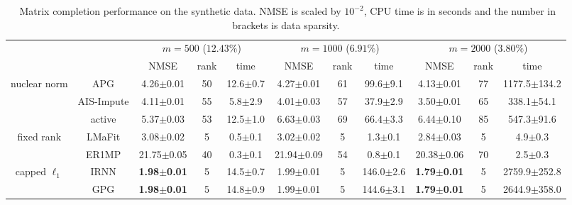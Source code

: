 \documentclass[10pt,journal,compsoc]{IEEEtran}
\begin{document}
\begin{table*}[ht]
	\centering
	\caption{$\!\!$ Matrix completion performance on the synthetic data.
		NMSE is scaled by $10^{-2}$, CPU time is in seconds and the number in brackets is data sparsity.}
	\vspace{-10px}
	\begin{tabular}{cc|ccc|ccc|ccc}
		\hline
		&                     &       \multicolumn{3}{c|}{$m=500$ ($12.43\%$)}       &       \multicolumn{3}{c|}{$m=1000$ ($6.91\%$)}       &       \multicolumn{3}{c}{$m=2000$ ($3.80\%$)}        \\
		&                     &          NMSE          & rank &         time         &          NMSE          & rank &         time         &          NMSE          & rank &         time         \\ \hline
		nuclear norm   &    \textsf{APG}     &     4.26$\pm$0.01      &  50  &     12.6$\pm$0.7     &     4.27$\pm$0.01      &  61  &     99.6$\pm$9.1     &     4.13$\pm$0.01      &  77  &   1177.5$\pm$134.2   \\ \cline{2-11}
		& \textsf{AIS-Impute} &     4.11$\pm$0.01      &  55  &     5.8$\pm$2.9      &     4.01$\pm$0.03      &  57  &     37.9$\pm$2.9     &     3.50$\pm$0.01      &  65  &    338.1$\pm$54.1    \\ \cline{2-11}
		&   \textsf{active}   &     5.37$\pm$0.03      &  53  &     12.5$\pm$1.0     &     6.63$\pm$0.03      &  69  &     66.4$\pm$3.3     &     6.44$\pm$0.10      &  85  &    547.3$\pm$91.6    \\ \hline\hline
		fixed rank    &   \textsf{LMaFit}   &     3.08$\pm$0.02      &  5   &     0.5$\pm$0.1      &     3.02$\pm$0.02      &  5   &     1.3$\pm$0.1      &     2.84$\pm$0.03      &  5   &     4.9$\pm$0.3      \\ \cline{2-11}
		&   \textsf{ER1MP}    &     21.75$\pm$0.05     &  40  &     0.3$\pm$0.1      &     21.94$\pm$0.09     &  54  &     0.8$\pm$0.1      &     20.38$\pm$0.06     &  70  &     2.5$\pm$0.3      \\ \hline\hline
		capped $\ell_1$ &    \textsf{IRNN}    & \textbf{1.98$\pm$0.01} &  5   &     14.5$\pm$0.7     &     1.99$\pm$0.01      &  5   &    146.0$\pm$2.6     & \textbf{1.79$\pm$0.01} &  5   &   2759.9$\pm$252.8   \\ \cline{2-11}
		&    \textsf{GPG}     & \textbf{1.98$\pm$0.01} &  5   &     14.8$\pm$0.9     &     1.99$\pm$0.01      &  5   &    144.6$\pm$3.1     & \textbf{1.79$\pm$0.01} &  5   &   2644.9$\pm$358.0   \\ \cline{2-11}

\end{tabular}
\end{table*}
\end{document}
